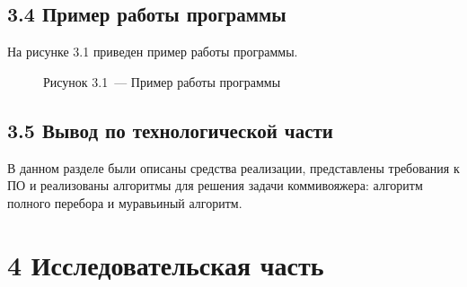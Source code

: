 \documentclass[12pt, a4paper]{report}
\begin{document}
	\section*{3.4 Пример работы программы}
	
	На рисунке 3.1 приведен пример работы программы.
	
	\begin{figure}[H]
		\caption*{Рисунок 3.1~--- Пример работы программы}
	\end{figure}
	
	\section*{3.5 Вывод по технологической части}
	
	В данном разделе были описаны средства реализации, представлены требования к ПО и реализованы алгоритмы для решения задачи коммивояжера: алгоритм полного перебора и муравьиный алгоритм.
	
	\chapter*{4 Исследовательская часть}
	
\end{document}
